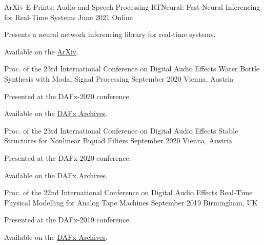\begin{cventries}
  \cventry
    {ArXiv E-Prints: Audio and Speech Processing} %
    {RTNeural: Fast Neural Inferencing for Real-Time Systems} %
    {June 2021} %
    {Online} %
    {
      \begin{cvitems} %
        \item {Presents a neural network inferencing library for real-time systems.}
        \item {Available on the \href{https://arxiv.org/pdf/2106.03037.pdf}{ArXiv}.}
      \end{cvitems}
    }

  \cventry
    {Proc. of the 23rd International Conference on Digital Audio Effects} %
    {Water Bottle Synthesis with Modal Signal Processing} %
    {September 2020} %
    {Vienna, Austria} %
    {
      \begin{cvitems} %
        \item {Presented at the DAFx-2020 conference.}
        \item {Available on the \href{https://www.dafx.de/paper-archive/2020/proceedings/papers/DAFx2020_paper_24.pdf}{DAFx Archives}.}
      \end{cvitems}
    }

  \cventry
    {Proc. of the 23rd International Conference on Digital Audio Effects} %
    {Stable Structures for Nonlinear Biquad Filters} %
    {September 2020} %
    {Vienna, Austria} %
    {
      \begin{cvitems} %
        \item {Presented at the DAFx-2020 conference.}
        \item {Available on the \href{https://www.dafx.de/paper-archive/2020/proceedings/papers/DAFx2020_paper_3.pdf}{DAFx Archives}.}
      \end{cvitems}
    }

  \cventry
    {Proc. of the 22nd International Conference on Digital Audio Effects} %
    {Real-Time Physical Modelling for Analog Tape Machines} %
    {September 2019} %
    {Birmingham, UK} %
    {
      \begin{cvitems} %
        \item {Presented at the DAFx-2019 conference.}
        \item {Available on the \href{http://www.dafx.de/paper-archive/2019/DAFx2019_paper_3.pdf}{DAFx Archives}.}
      \end{cvitems}
    }


\end{cventries}
